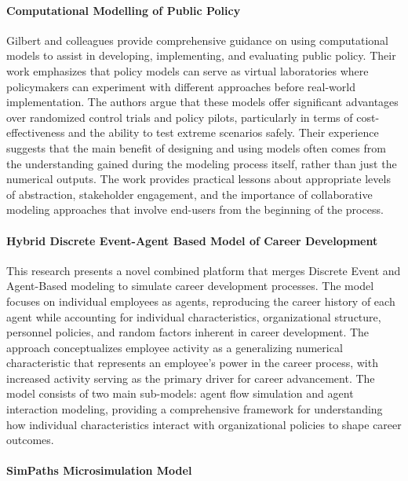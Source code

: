 \documentclass[main.tex]{subfiles}
\begin{document}
\paragraph{Computational Modelling of Public Policy}

Gilbert and colleagues provide comprehensive guidance on using computational models to assist in developing, implementing, and evaluating public policy\autocite{gilbert2018}. Their work emphasizes that policy models can serve as virtual laboratories where policymakers can experiment with different approaches before real-world implementation. The authors argue that these models offer significant advantages over randomized control trials and policy pilots, particularly in terms of cost-effectiveness and the ability to test extreme scenarios safely. Their experience suggests that the main benefit of designing and using models often comes from the understanding gained during the modeling process itself, rather than just the numerical outputs. The work provides practical lessons about appropriate levels of abstraction, stakeholder engagement, and the importance of collaborative modeling approaches that involve end-users from the beginning of the process.

\paragraph{Hybrid Discrete Event-Agent Based Model of Career Development}

This research presents a novel combined platform that merges Discrete Event and Agent-Based modeling to simulate career development processes\autocite{career-model}. The model focuses on individual employees as agents, reproducing the career history of each agent while accounting for individual characteristics, organizational structure, personnel policies, and random factors inherent in career development. The approach conceptualizes employee activity as a generalizing numerical characteristic that represents an employee's power in the career process, with increased activity serving as the primary driver for career advancement. The model consists of two main sub-models: agent flow simulation and agent interaction modeling, providing a comprehensive framework for understanding how individual characteristics interact with organizational policies to shape career outcomes.

\paragraph{SimPaths Microsimulation Model}
\end{document}
